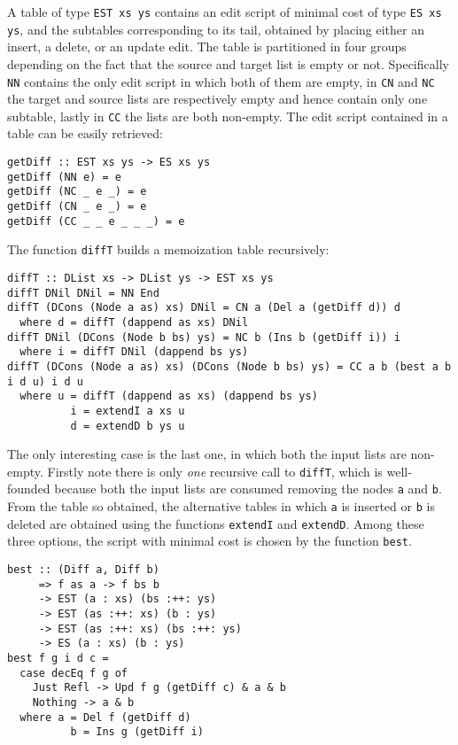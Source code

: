 \documentclass[../Thesis.tex]{subfiles}
\begin{document}
	A table of type \texttt{EST xs ys} contains an edit script
	of minimal cost of type \texttt{ES xs ys}, and the subtables
	corresponding to its tail, obtained by placing either an insert,
	a delete, or an update edit.
	The table is partitioned in four groups depending on the fact
	that the source and target list is empty or not.
	Specifically \texttt{NN} contains the only edit script in which both
	of them are empty, in \texttt{CN} and \texttt{NC} the target and source
	lists are respectively empty and hence contain only one subtable,
	lastly in \texttt{CC} the lists are both non-empty.
	The edit script contained in a table can be easily retrieved:
	
\begin{verbatim}
getDiff :: EST xs ys -> ES xs ys
getDiff (NN e) = e
getDiff (NC _ e _) = e
getDiff (CN _ e _) = e
getDiff (CC _ _ e _ _ _) = e
\end{verbatim}

	The function \texttt{diffT} builds a memoization table recursively:

\begin{verbatim}
diffT :: DList xs -> DList ys -> EST xs ys
diffT DNil DNil = NN End
diffT (DCons (Node a as) xs) DNil = CN a (Del a (getDiff d)) d 
  where d = diffT (dappend as xs) DNil
diffT DNil (DCons (Node b bs) ys) = NC b (Ins b (getDiff i)) i
  where i = diffT DNil (dappend bs ys)
diffT (DCons (Node a as) xs) (DCons (Node b bs) ys) = CC a b (best a b i d u) i d u
  where u = diffT (dappend as xs) (dappend bs ys)
          i = extendI a xs u
          d = extendD b ys u
\end{verbatim}
 
	The only interesting case is the last one, in which 
	both the input lists are non-empty.
	Firstly note there is only \emph{one} recursive call to \texttt{diffT},
	which is well-founded because both the input lists are consumed 
	removing the nodes \texttt{a} and \texttt{b}.
	From the table so obtained, the alternative tables in which 
	\texttt{a} is inserted or \texttt{b} is deleted are obtained using the functions
	\texttt{extendI} and \texttt{extendD}.
	Among these three options, the script with minimal cost is chosen
	by the function \texttt{best}.
	
\begin{verbatim}
best :: (Diff a, Diff b)
     => f as a -> f bs b
     -> EST (a : xs) (bs :++: ys)
     -> EST (as :++: xs) (b : ys)
     -> EST (as :++: xs) (bs :++: ys)
     -> ES (a : xs) (b : ys)
best f g i d c = 
  case decEq f g of
    Just Refl -> Upd f g (getDiff c) & a & b
    Nothing -> a & b
  where a = Del f (getDiff d)
          b = Ins g (getDiff i)
\end{verbatim}
	
\end{document}

